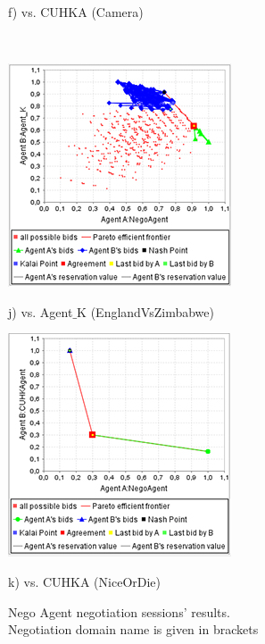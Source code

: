 \documentclass[html]{report}    %
\begin{document}
\begin{figure}[htbp]
\begin{minipage}{.3\textwidth}
		\caption*{f) vs. CUHKA (Camera)}
	\end{minipage}\\
	\begin{minipage}{.3\textwidth}
		\centering
		\includegraphics[width=.9\linewidth]{7}
		\caption*{j) vs. Agent$\_$K (EnglandVsZimbabwe)}
	\end{minipage}
	\begin{minipage}{.3\textwidth}
		\centering
		\includegraphics[width=.9\linewidth]{8}
		\caption*{k) vs. CUHKA (NiceOrDie)}
	\end{minipage}
	\caption{Nego Agent negotiation sessions' results. \\Negotiation domain name is given in brackets}
	\label{sessionGraphs}
\end{figure}
\end{document}
